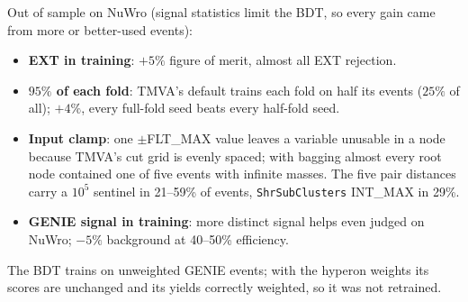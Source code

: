 \documentclass[11pt,a4paper]{article}
\begin{document}
Out of sample on NuWro (signal statistics limit the BDT, so every gain came from more or
better-used events):
\begin{center}
\end{center}
\begin{itemize}
  \item \textbf{EXT in training}: $+5\%$ figure of merit, almost all EXT rejection.
  \item \textbf{$95\%$ of each fold}: TMVA's default trains each fold on half its events
        ($25\%$ of all); $+4\%$, every full-fold seed beats every half-fold seed.
  \item \textbf{Input clamp}: one $\pm$FLT\_MAX value leaves a variable unusable in a node
        because TMVA's cut grid is evenly spaced; with bagging almost every root node
        contained one of five events with infinite masses. The five pair distances carry
        a $10^5$ sentinel in 21--59\% of events, \texttt{ShrSubClusters} INT\_MAX in 29\%.
  \item \textbf{GENIE signal in training}: more distinct signal helps even judged on NuWro;
        $-5\%$ background at 40--50\% efficiency.
\end{itemize}
The BDT trains on unweighted GENIE events; with the hyperon weights its scores are
unchanged and its yields correctly weighted, so it was not retrained.
\end{document}
